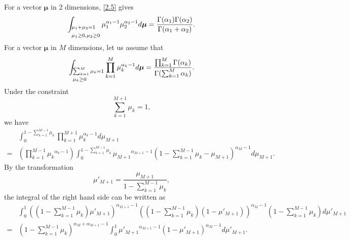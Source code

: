 \subsection{}
\label{2.9}
For a vector $\bm{\mu}$ in 2 dimensions, \ref{2.5} gives
%
\[
\int_{
\begin{subarray}{l}
\mu_1 
+ 
\mu_2 
= 
1 
\\
\\
\mu_1 
\geq 
0, 
\mu_2 
\geq 
0
\end{subarray}
} 
\mu_1 ^ {\alpha_1 - 1} 
\mu_2 ^ {\alpha_2 - 1} 
d\bm{\mu}
= 
\frac{\Gamma(\alpha_1) \Gamma(\alpha_2)}{\Gamma(\alpha_1 + \alpha_2)}.
\]
%
For a vector $\bm{\mu}$ in $M$ dimensions, let us assume that
%
\[ 
\int_{
\begin{subarray}{l}
\sum_{k = 1}^{M} 
\mu_k 
= 
1 
\\
\\
\mu_k 
\geq 
0
\end{subarray}
} 
\prod_{k = 1}^{M} 
\mu_k ^ {\alpha_k - 1} 
d\bm{\mu} 
= 
\frac
{\prod_{k = 1}^{M} \Gamma(\alpha_k)}
{\Gamma(\sum_{k = 1}^{M} \alpha_k)}.
\]
%
Under the constraint
%
\begin{equation}
\sum_{k = 1}^{M + 1}
\mu_k
=
1,
\end{equation}
%
we have
%
\begin{equation}
\begin{aligned}
&
\int_{0}^{1 - \sum_{k = 1}^{M - 1} \mu_k}
\prod_{k = 1}^{M + 1} 
\mu_k ^ {\alpha_k - 1} 
d\mu_{M + 1} 
\\
=& 
\left( 
	\prod_{k = 1}^{M - 1} 
	{\mu_k} ^ {\alpha_k - 1} 
\right)
\int_{0}^{1 - \sum_{k = 1}^{M - 1} \mu_k} 
{\mu_{M + 1}} ^ {\alpha_{M + 1} - 1} 
\left(
	1
	-
	\sum_{k = 1}^{M - 1} \mu_k
	-
	\mu_{M + 1}
\right) ^ {\alpha_M - 1}  
d\mu_{M + 1}.
\end{aligned}
\end{equation}
%
By the transformation
%
\begin{equation}
\mu'_{M + 1}
=
\frac
{\mu_{M + 1}}
{1
-
\sum_{k = 1}^{M - 1} \mu_k},
\end{equation}
%
the integral of the right hand side can be written as
%
\begin{equation}
\begin{aligned}
&
\int_{0}^{1}
\left(
	\left(
		1
		-
		\sum_{k = 1}^{M - 1} 
		\mu_k
	\right)
	\mu'_{M + 1}
\right) ^ {\alpha_{M + 1} - 1}
\left(
	\left(
		1
		-
		\sum_{k = 1}^{M - 1} 
		\mu_k
	\right)
	\left(
		1
		-
		\mu'_{M + 1}
	\right)
\right) ^ {\alpha_M - 1}
\left(
	1
	-
	\sum_{k = 1}^{M - 1} 
	\mu_k
\right)
d\mu'_{M + 1}
\\
=&
\left(
	1
	-
	\sum_{k = 1}^{M - 1} 
	\mu_k
\right) ^ {\alpha_M + \alpha_{M + 1} - 1}
\int_{0}^{1}
{\mu'_{M + 1}} ^ {\alpha_{M + 1} - 1}
(1 - \mu'_{M + 1}) ^ {\alpha_M - 1}
d\mu'_{M + 1}.
\end{aligned}
\end{equation}
